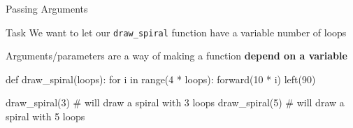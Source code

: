 \begin{frame}[fragile]{Passing Arguments}

    \begin{block}{Task}
        We want to let our \texttt{draw\_spiral} function have a variable number of loops
    \end{block}

    Arguments/parameters are a way of making a function \textbf{depend on a variable}

    \begin{pythoncode}
    def draw_spiral(loops):
        for i in range(4 * loops):
            forward(10 * i)
            left(90)

    draw_spiral(3)  # will draw a spiral with 3 loops
    draw_spiral(5)  # will draw a spiral with 5 loops
    \end{pythoncode}


\end{frame}

